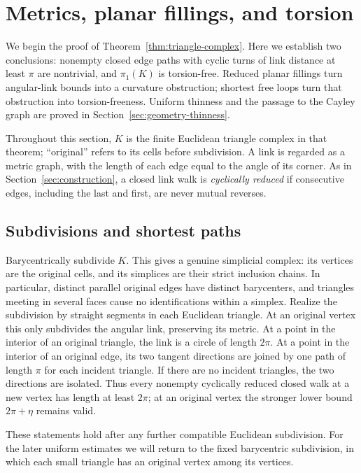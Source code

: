 \section{Metrics, planar fillings, and torsion}
\label{sec:geometry-foundations}

We begin the proof of Theorem~\ref{thm:triangle-complex}. Here we establish
two conclusions: nonempty closed edge paths with cyclic
turns of link distance at least $\pi$ are nontrivial, and $\pi_1(K)$ is
torsion-free. Reduced planar fillings turn angular-link bounds into a
curvature obstruction; shortest free loops turn that obstruction into
torsion-freeness. Uniform thinness and the passage to the Cayley graph
are proved in Section~\ref{sec:geometry-thinness}.

Throughout this section, $K$ is the finite Euclidean triangle complex in that theorem;
``original'' refers to its cells before subdivision. A link is regarded as a
metric graph, with the length of each edge equal to the angle of its corner.
As in Section~\ref{sec:construction}, a closed link walk is
\emph{cyclically reduced} if consecutive edges, including the last
and first, are never mutual reverses.

\subsection{Subdivisions and shortest paths}

Barycentrically subdivide $K$. This gives a genuine simplicial complex:
its vertices are the original cells, and its simplices are their strict
inclusion chains. In particular, distinct parallel original edges have
distinct barycenters, and triangles meeting in several faces cause no
identifications within a simplex. Realize the subdivision by straight
segments in each Euclidean triangle. At an original vertex this only
subdivides the angular link, preserving its metric. At a point in the
interior of an original triangle, the link is a circle of length $2\pi$.
At a point in the interior of an original edge, its two tangent directions
are joined by one path of length $\pi$ for each incident triangle. If there
are no incident triangles, the two directions are isolated. Thus every
nonempty cyclically reduced closed walk at a new vertex has length
at least $2\pi$; at an original vertex the stronger lower bound
$2\pi+\eta$ remains valid.

These statements hold after any further compatible Euclidean subdivision.
For the later uniform estimates we will return to the fixed barycentric
subdivision, in which each small triangle has an original vertex among its
vertices.

